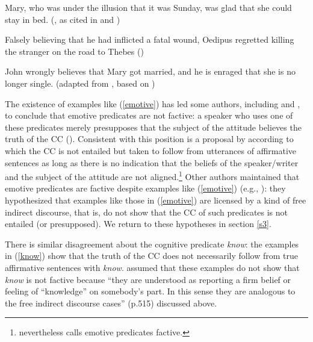 \documentclass[11pt,fleqn]{article}
\newcommand{\6}{\mbox{$[\hspace*{-.6mm}[$}}
\newcommand{\9}{\mbox{$]\hspace*{-.6mm}]$}}
\begin{document}
\begin{exe}
\ex\label{emotive}
\begin{xlist}

\ex\label{heim2} Mary, who was under the illusion that it was Sunday, was glad that she could stay in bed. (\citealt{klein1975}, as cited in \citealt[122]{gazdar79a} and \citealt[fn37]{heim92}) 

\ex Falsely believing that he had inflicted a fatal wound, Oedipus regretted killing the stranger on the road to Thebes \hfill (\citealt{klein1975})

\ex John wrongly believes that Mary got married, and he is enraged that she is no longer single. \hspace*{.2cm} \hfill (adapted from \citealt{egre2008}, based on \citealt{schlenker03})

\end{xlist}
\end{exe}
The existence of examples like (\ref{emotive}) has led some authors, including \citet{klein1975,giannakidou1998,schlenker2003} and \citet{egre2008}, to conclude that emotive predicates are not factive: a speaker who uses one of these predicates merely presupposes that the subject of the attitude believes the truth of the CC (\citealt{heim92}). Consistent with this position is a proposal by \citet{karttunen2016} according to which the CC is not entailed but taken to follow from utterances of affirmative sentences as long as there is no indication that the beliefs of the speaker/writer and the subject of the attitude are not aligned.\footnote{\citet{karttunen2016} nevertheless calls emotive predicates factive.}  Other authors maintained that emotive predicates are factive despite examples like (\ref{emotive}) (e.g., \citealt{gazdar79a,abrusan2011,anand-hacquard2014}): they hypothesized that examples like those in (\ref{emotive}) are licensed by a kind of free indirect discourse, that is, do not show that the CC of such predicates is not entailed (or presupposed). We return to these hypotheses in section \ref{s3}.

There is similar disagreement about the cognitive predicate {\em know}: the examples in (\ref{know}) show that the truth of the CC does not necessarily follow from true affirmative sentences with {\em know}. \citet{abrusan2011} assumed that these examples do not show that {\em know} is not factive because ``they are understood as reporting a firm belief or feeling of ``knowledge'' on somebody's part. In this sense they are analogous to the free indirect discourse cases'' (p.515) discussed above.
\end{document}
